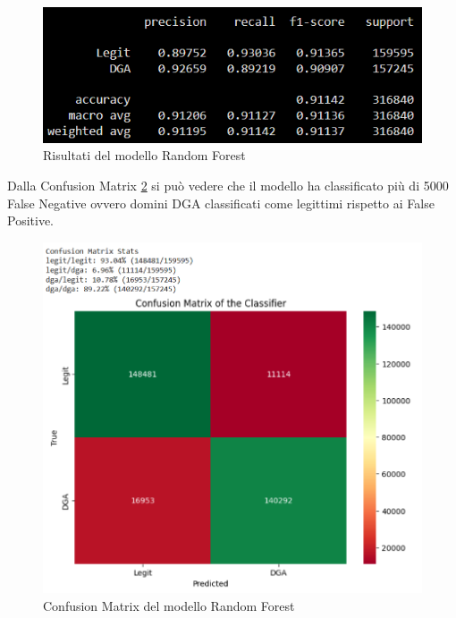\documentclass[12pt,a4paper,openright,twoside]{book}
\begin{document}
\begin{figure}[H]
    \centering
    \includegraphics[width=.8\linewidth]{figures/RF_results.png}
    \caption{Risultati del modello Random Forest}
    \label{fig:RF results}
\end{figure}

\noindent Dalla Confusion Matrix \ref{fig:RF confusion matrix} si può vedere che il modello ha classificato
più di 5000 False Negative ovvero domini DGA classificati come legittimi rispetto ai False Positive.

\begin{figure}[H]
    \centering
    \includegraphics[width=.8\linewidth]{figures/RF_conf_matr.png}
    \caption{Confusion Matrix del modello Random Forest}
    \label{fig:RF confusion matrix}
\end{figure}
\end{document}
